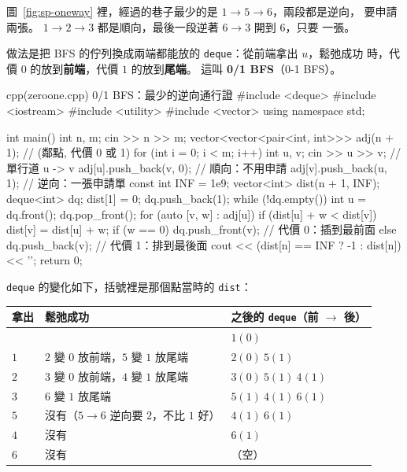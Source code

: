 圖~\ref{fig:sp-oneway} 裡，經過的巷子最少的是 $1 \to 5 \to 6$，兩段都是逆向，
要申請兩張。 $1 \to 2 \to 3$ 都是順向，最後一段逆著 $6 \to 3$ 開到 $6$，只要
一張。

做法是把 BFS 的佇列換成兩端都能放的 \texttt{deque}：從前端拿出 $u$，鬆弛成功
時，代價 $0$ 的放到\textbf{前端}，代價 $1$ 的放到\textbf{尾端}。 這叫
\textbf{0/1 BFS}（0-1 BFS）。

\begin{example}[label=ex:sp-zeroone]{cpp}{(zeroone.cpp) 0/1 BFS：最少的逆向通行證}
#include <deque>
#include <iostream>
#include <utility>
#include <vector>
using namespace std;

int main() {
    int n, m;
    cin >> n >> m;
    vector<vector<pair<int, int>>> adj(n + 1);   // (鄰點, 代價 0 或 1)
    for (int i = 0; i < m; i++) {
        int u, v;
        cin >> u >> v;                           // 單行道 u -> v
        adj[u].push_back({v, 0});                // 順向：不用申請
        adj[v].push_back({u, 1});                // 逆向：一張申請單
    }
    const int INF = 1e9;
    vector<int> dist(n + 1, INF);
    deque<int> dq;
    dist[1] = 0;
    dq.push_back(1);
    while (!dq.empty()) {
        int u = dq.front();
        dq.pop_front();
        for (auto [v, w] : adj[u]) {
            if (dist[u] + w < dist[v]) {
                dist[v] = dist[u] + w;
                if (w == 0) {
                    dq.push_front(v);            // 代價 0：插到最前面
                } else {
                    dq.push_back(v);             // 代價 1：排到最後面
                }
            }
        }
    }
    cout << (dist[n] == INF ? -1 : dist[n]) << '\n';
    return 0;
}
\end{example}


\texttt{deque} 的變化如下，括號裡是那個點當時的 \texttt{dist}：

\begin{center}
\begin{tabular}{lll}
\toprule
拿出 & 鬆弛成功 & 之後的 \texttt{deque}（前 $\to$ 後） \\
\midrule
 & & $1(0)$ \\
$1$ & $2$ 變 $0$ 放前端，$5$ 變 $1$ 放尾端 & $2(0)\ 5(1)$ \\
$2$ & $3$ 變 $0$ 放前端，$4$ 變 $1$ 放尾端 & $3(0)\ 5(1)\ 4(1)$ \\
$3$ & $6$ 變 $1$ 放尾端 & $5(1)\ 4(1)\ 6(1)$ \\
$5$ & 沒有（$5 \to 6$ 逆向要 $2$，不比 $1$ 好） & $4(1)\ 6(1)$ \\
$4$ & 沒有 & $6(1)$ \\
$6$ & 沒有 & （空） \\
\bottomrule
\end{tabular}
\end{center}


